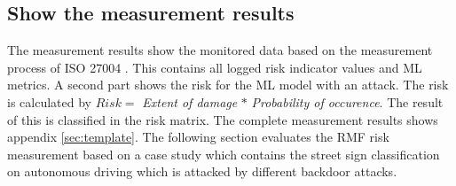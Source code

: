 \subsection{Show the measurement results}

The measurement results show the monitored data based on the measurement process of ISO 27004 \cite{ISO_27004_2009}. This contains all logged risk indicator values and ML metrics.  A second part shows the risk for the ML model with an attack. The risk is calculated by $Risk = $ \textit{Extent of damage} $*$ \textit{Probability of occurence}. The result of this is classified in the risk matrix. The complete measurement results shows appendix \ref{sec:template}. The following section evaluates the RMF risk measurement based on a case study which contains the street sign classification on autonomous driving which is attacked by different backdoor attacks.
